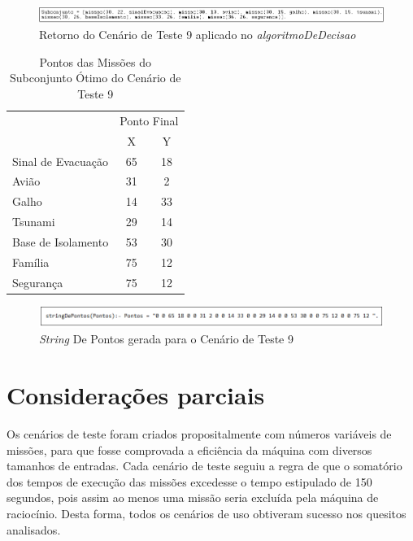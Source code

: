 \FloatBarrier
\begin{figure}[!h]
\centering
\includegraphics[keepaspectratio=true,scale=0.7]{figuras/resultado9.png}
\caption{Retorno do Cenário de Teste 9 aplicado no \textit{algoritmoDeDecisao}}
\label{resultado9}
\end{figure}


\begin{table}[!h]
\centering
\caption{Pontos das Missões do Subconjunto Ótimo do Cenário de Teste 9}
\label{pontoCT9}
\begin{tabular}{lcc}
\rowcolor[HTML]{00D2CB} 
\multicolumn{1}{c}{\cellcolor[HTML]{00D2CB}} & \multicolumn{2}{l}{\cellcolor[HTML]{00D2CB}Ponto Final} \\ 
\rowcolor[HTML]{C0F2F0} 
\multicolumn{1}{c}{\cellcolor[HTML]{00D2CB}Missão} & \multicolumn{1}{c}{\cellcolor[HTML]{C0F2F0}X} & \multicolumn{1}{c}{\cellcolor[HTML]{C0F2F0}Y} \\
 Sinal de Evacuação & 65 & 18 \\
 Avião & 31 & 2 \\
 Galho & 14 & 33 \\
 Tsunami & 29 & 14 \\
 Base de Isolamento & 53 & 30 \\
 Família & 75 & 12 \\
 Segurança & 75 & 12    \\          
\end{tabular}
\end{table}

\FloatBarrier
\begin{figure}[!h]
\centering
\includegraphics[keepaspectratio=true,scale=0.7]{figuras/stringCT9.png}
\caption{\textit{String} De Pontos gerada para o Cenário de Teste 9}
\label{stringCT9}
\end{figure}


\section{Considerações parciais}
	Os cenários de teste foram criados propositalmente com números variáveis de missões, para que fosse comprovada a eficiência da máquina com diversos tamanhos de entradas. Cada cenário de teste seguiu a regra de que o somatório dos tempos de execução das missões excedesse o tempo estipulado de 150 segundos, pois assim ao menos uma missão seria excluída pela máquina de raciocínio.
	Desta forma, todos os cenários de uso obtiveram sucesso nos quesitos analisados.